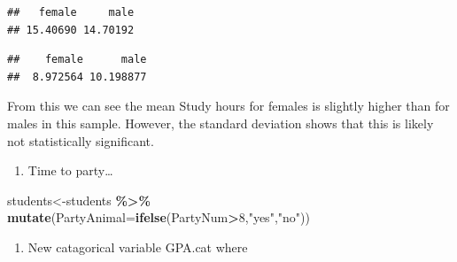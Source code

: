 \documentclass[
  openany]{book}
\newenvironment{Shaded}{\begin{snugshade}}{\end{snugshade}}
\newcommand{\AttributeTok}[1]{\textcolor[rgb]{0.13,0.29,0.53}{#1}}
\newcommand{\DecValTok}[1]{\textcolor[rgb]{0.00,0.00,0.81}{#1}}
\newcommand{\FunctionTok}[1]{\textcolor[rgb]{0.13,0.29,0.53}{\textbf{#1}}}
\newcommand{\NormalTok}[1]{#1}
\newcommand{\OtherTok}[1]{\textcolor[rgb]{0.56,0.35,0.01}{#1}}
\newcommand{\SpecialCharTok}[1]{\textcolor[rgb]{0.81,0.36,0.00}{\textbf{#1}}}
\newcommand{\StringTok}[1]{\textcolor[rgb]{0.31,0.60,0.02}{#1}}
\providecommand{\tightlist}{%
  \setlength{\itemsep}{0pt}\setlength{\parskip}{0pt}}
\begin{document}
\begin{Shaded}
\end{Shaded}

\begin{verbatim}
##   female     male 
## 15.40690 14.70192
\end{verbatim}

\begin{Shaded}
\end{Shaded}

\begin{verbatim}
##    female      male 
##  8.972564 10.198877
\end{verbatim}

From this we can see the mean Study hours for females is slightly higher than for males in this sample. However, the standard deviation shows that this is likely not statistically significant.

\begin{enumerate}
\def\labelenumi{\arabic{enumi}.}
\setcounter{enumi}{5}
\tightlist
\item
  Time to party\ldots{}
\end{enumerate}

\begin{Shaded}
\begin{Highlighting}[]
\NormalTok{students}\OtherTok{\textless{}{-}}\NormalTok{students }\SpecialCharTok{\%\textgreater{}\%} 
  \FunctionTok{mutate}\NormalTok{(}\AttributeTok{PartyAnimal=}\FunctionTok{ifelse}\NormalTok{(PartyNum}\SpecialCharTok{\textgreater{}}\DecValTok{8}\NormalTok{,}\StringTok{"yes"}\NormalTok{,}\StringTok{"no"}\NormalTok{))}
\end{Highlighting}
\end{Shaded}

\begin{enumerate}
\def\labelenumi{\arabic{enumi}.}
\setcounter{enumi}{6}
\tightlist
\item
  New catagorical variable GPA.cat where
\end{enumerate}
\end{document}
